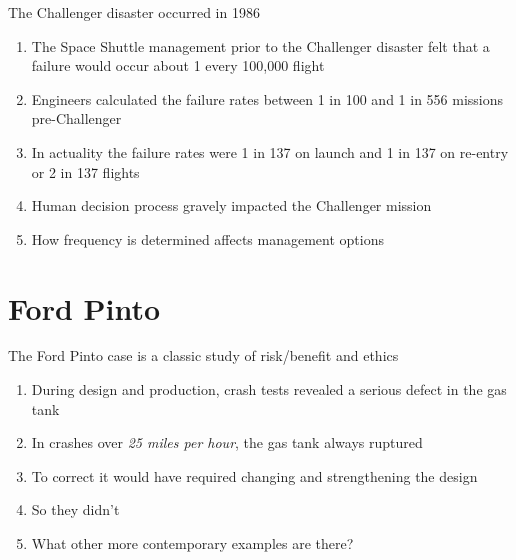 \documentclass[aspectratio=1610,pdftex,dvipsnames,compress,xcolor={dvipsnames}]{beamer}
\begin{document}
\addtocounter{framenumber}{-2}
\begin{frame}{The Challenger disaster occurred in 1986}
    \begin{enumerate}[series=outerlist,topsep=0pt,itemsep=21pt,leftmargin=*,label=(\arabic*)]
        \item[]The Space Shuttle management prior to the Challenger disaster felt that a failure would occur about 1 every 100,000 flight
        \item[]Engineers calculated the failure rates between 1 in 100 and 1 in 556 missions pre-Challenger
        \item[]In actuality the failure rates were 1 in 137 on launch and 1 in 137 on re-entry or 2 in 137 flights
        \item[]Human decision process gravely impacted the Challenger mission 
        \item[]How frequency is determined affects management options
    \end{enumerate}
\end{frame}


\section{Ford Pinto}


\addtocounter{framenumber}{-1}
\begin{frame}{The Ford Pinto case is a classic study of risk/benefit and ethics}
    \begin{enumerate}[series=outerlist,topsep=0pt,itemsep=21pt,leftmargin=*,label=(\arabic*)]
        \item[]During design and production, crash tests revealed a serious defect in the gas tank
        \item[]In crashes over \textit{25 miles per hour}, the gas tank always ruptured
        \item[]To correct it would have required changing and strengthening the design
        \item[]So they didn’t
        \item[]What other more contemporary examples are there?
    \end{enumerate}
\end{frame}
\end{document}
